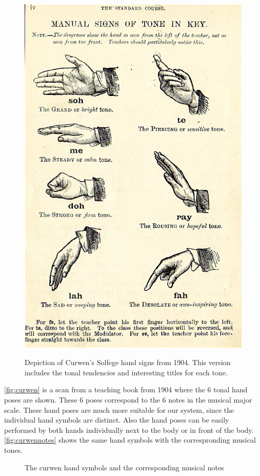 \begin{figure}[htbp]
	\center{}
	\includegraphics[width=0.6\linewidth]{figures/curwen.jpg}
	\label{fig:curwen}
	\caption{Depiction of Curwen's Solfege hand signs from 1904. This version includes the tonal tendencies and interesting titles for each tone.}
\end{figure}

\autoref{fig:curwen} is a scan from a teaching book from 1904 where the 6 tonal hand poses are shown. These 6 poses correspond to the 6 notes in the musical major scale. These hand poses are much more suitable for our system, since the individual hand symbols are distinct. Also the hand poses can be easily performed by both hands individually next to the body or in front of the body. \autoref{fig:curwennotes} shows the same hand symbols with the correspronding musical tones.

\begin{figure}[htbp]
	\center{}
	\hspace{0.03\linewidth}
	\caption{The curwen hand symbols and the corresponding musical notes}
	\label{fig:curwennotes}
\end{figure}




